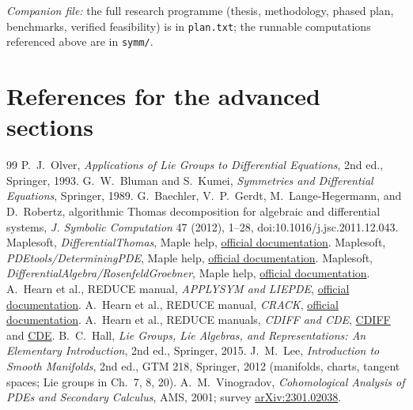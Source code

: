 \documentclass[11pt]{article}
\theoremstyle{definition}
\theoremstyle{remark}
\begin{document}
\bigskip
\noindent\emph{Companion file:} the full research programme (thesis, methodology, phased plan, benchmarks,
verified feasibility) is in \texttt{plan.txt}; the runnable computations referenced above are in
\texttt{symm/}.


\section*{References for the advanced sections}
\begin{thebibliography}{99}
   P.~J.~Olver, \emph{Applications of Lie Groups to Differential Equations}, 2nd ed., Springer, 1993.
   G.~W.~Bluman and S.~Kumei, \emph{Symmetries and Differential Equations}, Springer, 1989.
   G.~Baechler, V.~P.~Gerdt, M.~Lange-Hegermann, and D.~Robertz, algorithmic Thomas decomposition for algebraic and differential systems, \emph{J. Symbolic Computation} 47 (2012), 1--28, doi:10.1016/j.jsc.2011.12.043.
   Maplesoft, \emph{DifferentialThomas}, Maple help, \href{https://www.maplesoft.com/support/help/maple/view.aspx?path=DifferentialThomas}{official documentation}.
   Maplesoft, \emph{PDEtools/DeterminingPDE}, Maple help, \href{https://www.maplesoft.com/support/help/maple/view.aspx?path=PDEtools/DeterminingPDE}{official documentation}.
   Maplesoft, \emph{DifferentialAlgebra/RosenfeldGroebner}, Maple help, \href{https://www.maplesoft.com/support/help/maple/view.aspx?path=DifferentialAlgebra/RosenfeldGroebner}{official documentation}.
   A.~Hearn et al., REDUCE manual, \emph{APPLYSYM and LIEPDE}, \href{https://reduce-algebra.sourceforge.io/manual/manualse127.html}{official documentation}.
   A.~Hearn et al., REDUCE manual, \emph{CRACK}, \href{https://reduce-algebra.sourceforge.io/manual/manualse141.html}{official documentation}.
   A.~Hearn et al., REDUCE manuals, \emph{CDIFF and CDE}, \href{https://reduce-algebra.sourceforge.io/manual/manualse137.html}{CDIFF} and \href{https://reduce-algebra.sourceforge.io/manual/manualse136.html}{CDE}.
   B.~C.~Hall, \emph{Lie Groups, Lie Algebras, and Representations: An Elementary Introduction}, 2nd ed., Springer, 2015.
   J.~M.~Lee, \emph{Introduction to Smooth Manifolds}, 2nd ed., GTM 218, Springer, 2012 (manifolds, charts, tangent spaces; Lie groups in Ch.~7, 8, 20).
   A.~M.~Vinogradov, \emph{Cohomological Analysis of PDEs and Secondary Calculus}, AMS, 2001; survey \href{https://arxiv.org/abs/2301.02038}{arXiv:2301.02038}.

\end{thebibliography}
\end{document}
